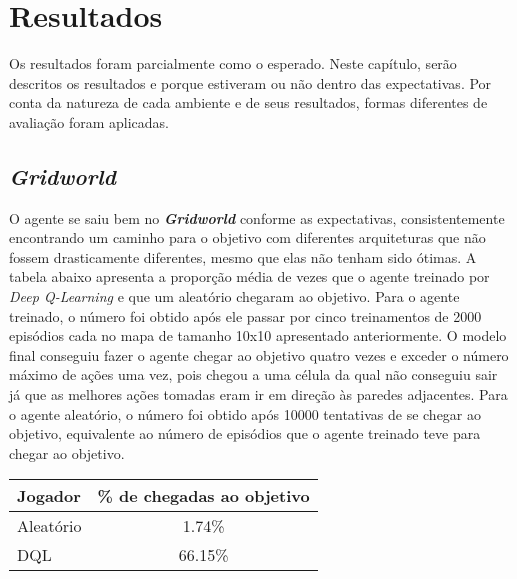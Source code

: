 
\chapter{Resultados}
\label{cap:resultados}

Os resultados foram parcialmente como o esperado.
Neste capítulo, serão descritos os resultados e porque estiveram ou não dentro das expectativas.
Por conta da natureza de cada ambiente e de seus resultados, formas diferentes de avaliação foram aplicadas.

\section{\textit{Gridworld}}
\label{sec:res_gridworld}

O agente se saiu bem no \textbf{\textit{Gridworld}} conforme as expectativas, consistentemente encontrando um caminho para o objetivo com diferentes arquiteturas que não fossem drasticamente diferentes, mesmo que elas não tenham sido ótimas.
A tabela abaixo apresenta a proporção média de vezes que o agente treinado por \textit{Deep Q-Learning} e que um aleatório chegaram ao objetivo.
Para o agente treinado, o número foi obtido após ele passar por cinco treinamentos de 2000 episódios cada no mapa de tamanho 10x10 apresentado anteriormente.
O modelo final conseguiu fazer o agente chegar ao objetivo quatro vezes e exceder o número máximo de ações uma vez, pois chegou a uma célula da qual não conseguiu sair já que as melhores ações tomadas eram ir em direção às paredes adjacentes.
Para o agente aleatório, o número foi obtido após 10000 tentativas de se chegar ao objetivo, equivalente ao número de episódios que o agente treinado teve para chegar ao objetivo.

\begin{center}
\begin{tabular}{l c}
\hline
Jogador & \% de chegadas ao objetivo \\
\hline
Aleatório & 1.74\% \\
DQL & 66.15\% \\
\hline
\end{tabular}
\label{table:gridworld_score}
\end{center}


